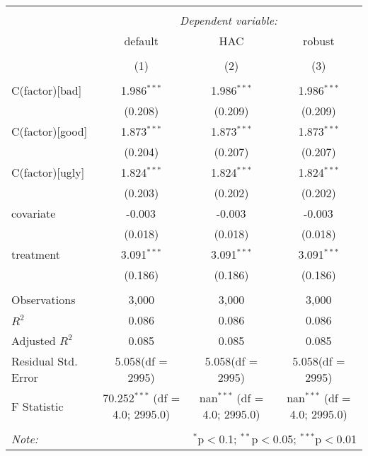 \begin{table}[!htbp] \centering
\begin{tabular}{@{\extracolsep{5pt}}lccc}
\\[-1.8ex]\hline
\hline \\[-1.8ex]
& \multicolumn{3}{c}{\textit{Dependent variable:}} \
\cr \cline{3-4}
\\[-1.8ex] & \multicolumn{1}{c}{default} & \multicolumn{1}{c}{HAC} & \multicolumn{1}{c}{robust}  \\
\\[-1.8ex] & (1) & (2) & (3) \\
\hline \\[-1.8ex]
 C(factor)[bad] & 1.986$^{***}$ & 1.986$^{***}$ & 1.986$^{***}$ \\
  & (0.208) & (0.209) & (0.209) \\
 C(factor)[good] & 1.873$^{***}$ & 1.873$^{***}$ & 1.873$^{***}$ \\
  & (0.204) & (0.207) & (0.207) \\
 C(factor)[ugly] & 1.824$^{***}$ & 1.824$^{***}$ & 1.824$^{***}$ \\
  & (0.203) & (0.202) & (0.202) \\
 covariate & -0.003$^{}$ & -0.003$^{}$ & -0.003$^{}$ \\
  & (0.018) & (0.018) & (0.018) \\
 treatment & 3.091$^{***}$ & 3.091$^{***}$ & 3.091$^{***}$ \\
  & (0.186) & (0.186) & (0.186) \\
\hline \\[-1.8ex]
 Observations & 3,000 & 3,000 & 3,000 \\
 $R^2$ & 0.086 & 0.086 & 0.086 \\
 Adjusted $R^2$ & 0.085 & 0.085 & 0.085 \\
 Residual Std. Error & 5.058(df = 2995) & 5.058(df = 2995) & 5.058(df = 2995)  \\
 F Statistic & 70.252$^{***}$ (df = 4.0; 2995.0) & nan$^{***}$ (df = 4.0; 2995.0) & nan$^{***}$ (df = 4.0; 2995.0) \\
\hline
\hline \\[-1.8ex]
\textit{Note:} & \multicolumn{3}{r}{$^{*}$p$<$0.1; $^{**}$p$<$0.05; $^{***}$p$<$0.01} \\
\end{tabular}
\end{table}